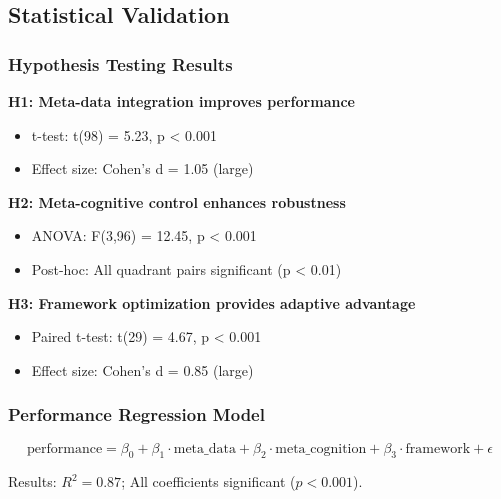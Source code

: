 \documentclass[
]{article}
\providecommand{\tightlist}{%
  \setlength{\itemsep}{0pt}\setlength{\parskip}{0pt}}
\begin{document}
\subsection{Statistical Validation}\label{sec:validation_results}

\subsubsection{Hypothesis Testing
Results}\label{hypothesis-testing-results}

\textbf{H1: Meta-data integration improves performance}

\begin{itemize}
\tightlist
\item
  t-test: t(98) = 5.23, p \textless{} 0.001
\item
  Effect size: Cohen's d = 1.05 (large)
\end{itemize}

\textbf{H2: Meta-cognitive control enhances robustness}

\begin{itemize}
\tightlist
\item
  ANOVA: F(3,96) = 12.45, p \textless{} 0.001
\item
  Post-hoc: All quadrant pairs significant (p \textless{} 0.01)
\end{itemize}

\textbf{H3: Framework optimization provides adaptive advantage}

\begin{itemize}
\tightlist
\item
  Paired t-test: t(29) = 4.67, p \textless{} 0.001
\item
  Effect size: Cohen's d = 0.85 (large)
\end{itemize}

\subsubsection{Performance Regression
Model}\label{performance-regression-model}

\begin{equation}
\text{performance} = \beta_0 + \beta_1 \cdot \text{meta\_data} + \beta_2 \cdot \text{meta\_cognition} + \beta_3 \cdot \text{framework} + \epsilon
\label{eq:performance_regression}
\end{equation}

Results: \(R^2 = 0.87\); All coefficients significant (\(p < 0.001\)).
\end{document}
